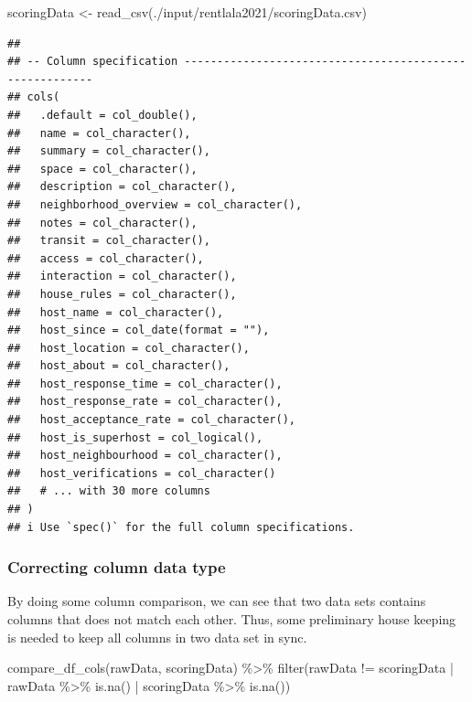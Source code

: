 \documentclass[
]{article}
\newenvironment{Shaded}{\begin{snugshade}}{\end{snugshade}}
\newcommand{\FunctionTok}[1]{\textcolor[rgb]{0.00,0.00,0.00}{#1}}
\newcommand{\NormalTok}[1]{#1}
\newcommand{\OtherTok}[1]{\textcolor[rgb]{0.56,0.35,0.01}{#1}}
\newcommand{\SpecialCharTok}[1]{\textcolor[rgb]{0.00,0.00,0.00}{#1}}
\newcommand{\StringTok}[1]{\textcolor[rgb]{0.31,0.60,0.02}{#1}}
\begin{document}
\begin{Shaded}
\begin{Highlighting}[]
\NormalTok{scoringData }\OtherTok{\textless{}{-}} \FunctionTok{read\_csv}\NormalTok{(}\StringTok{\textquotesingle{}./input/rentlala2021/scoringData.csv\textquotesingle{}}\NormalTok{)}
\end{Highlighting}
\end{Shaded}

\begin{verbatim}
## 
## -- Column specification --------------------------------------------------------
## cols(
##   .default = col_double(),
##   name = col_character(),
##   summary = col_character(),
##   space = col_character(),
##   description = col_character(),
##   neighborhood_overview = col_character(),
##   notes = col_character(),
##   transit = col_character(),
##   access = col_character(),
##   interaction = col_character(),
##   house_rules = col_character(),
##   host_name = col_character(),
##   host_since = col_date(format = ""),
##   host_location = col_character(),
##   host_about = col_character(),
##   host_response_time = col_character(),
##   host_response_rate = col_character(),
##   host_acceptance_rate = col_character(),
##   host_is_superhost = col_logical(),
##   host_neighbourhood = col_character(),
##   host_verifications = col_character()
##   # ... with 30 more columns
## )
## i Use `spec()` for the full column specifications.
\end{verbatim}

\hypertarget{correcting-column-data-type}{%
\subsubsection{Correcting column data
type}\label{correcting-column-data-type}}

By doing some column comparison, we can see that two data sets contains
columns that does not match each other. Thus, some preliminary house
keeping is needed to keep all columns in two data set in sync.

\begin{Shaded}
\begin{Highlighting}[]
\FunctionTok{compare\_df\_cols}\NormalTok{(rawData, scoringData) }\SpecialCharTok{\%\textgreater{}\%}
  \FunctionTok{filter}\NormalTok{(rawData }\SpecialCharTok{!=}\NormalTok{ scoringData }\SpecialCharTok{|}
\NormalTok{           rawData }\SpecialCharTok{\%\textgreater{}\%} \FunctionTok{is.na}\NormalTok{() }\SpecialCharTok{|}\NormalTok{ scoringData }\SpecialCharTok{\%\textgreater{}\%} \FunctionTok{is.na}\NormalTok{())}
\end{Highlighting}
\end{Shaded}
\end{document}
